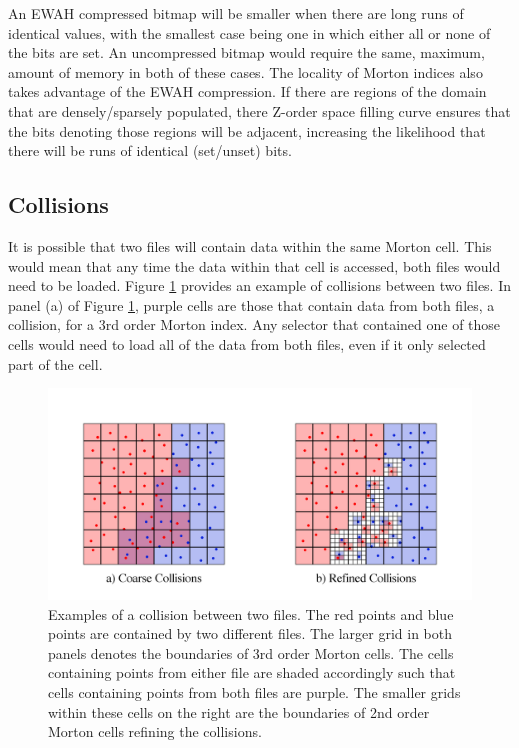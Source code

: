 \documentclass[apjl]{emulateapj}
\begin{document}
An EWAH compressed bitmap will be smaller when there are long runs of identical values, with the smallest case being one in which either all or none of the bits are set. An uncompressed bitmap would require the same, maximum, amount of memory in both of these cases. The locality of Morton indices also takes advantage of the EWAH compression. If there are regions of the domain that are densely/sparsely populated, there Z-order space filling curve ensures that the bits denoting those regions will be adjacent, increasing the likelihood that there will be runs of identical (set/unset) bits.



\subsection{Collisions}
It is possible that two files will contain data within the same Morton cell. This would mean that any time the data within that cell is accessed, both files would need to be loaded. Figure \ref{fig:collision} provides an example of collisions between two files. In panel (a) of Figure \ref{fig:collision}, purple cells are those that contain data from both files, a collision, for a 3rd order Morton index. Any selector that contained one of those cells would need to load all of the data from both files, even if it only selected part of the cell.
%
\begin{figure}[htbp]
\begin{center}
\includegraphics[width=\columnwidth,keepaspectratio]{../images/collisions.png}
\caption{Examples of a collision between two files. The red points and blue points are contained by two different files. The larger grid in both panels denotes the boundaries of 3rd order Morton cells.  The cells containing points from either file are shaded accordingly such that cells containing points from both files are purple. The smaller grids within these cells on the right are the boundaries of 2nd order Morton cells refining the collisions.}
\label{fig:collision}
\end{center}
\end{figure}
%
\end{document}
